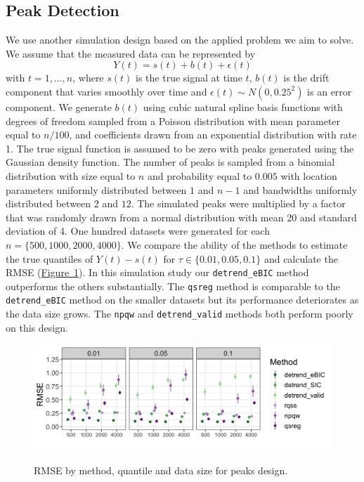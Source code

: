 \documentclass[12pt]{article}
\newcommand{\Fig}[1]{\hyperref[fig:#1]{Figure~\ref*{fig:#1}}} %
\newcommand{\Fig}[1]{{Figure~\ref{fig:#1}}} %
\begin{document}
	\subsection{Peak Detection}
	We use another simulation design based on the applied problem we aim to solve. We assume that the measured data can be represented by 
	\begin{equation}
	Y(t) = s(t) + b(t) + \epsilon(t)
	\end{equation} 
	with $t = 1, \ldots, n$, where $s(t)$ is the true signal at time $t$, $b(t)$ is the drift component that varies smoothly over time and $\epsilon(t) \sim N(0, 0.25^2)$ is an error component. We generate $b(t)$ using cubic natural spline basis functions with degrees of freedom sampled from a Poisson distribution with mean parameter equal to $n/100$,  and coefficients drawn from an exponential distribution with rate 1. The true signal function is assumed to be zero with peaks generated using the Gaussian density function. The number of peaks is sampled from a binomial distribution with size equal to $n$ and probability equal to $0.005$ with location parameters uniformly distributed between $1$ and $n-1$ and bandwidths uniformly distributed between $2$ and $12$. The simulated peaks were multiplied by a factor that was randomly drawn from a normal distribution with mean 20 and standard deviation of 4. One hundred datasets were generated for each $n=\{500, 1000, 2000, 4000\}$. We compare the ability of the methods to estimate the true quantiles of $Y(t)-s(t)$  for $\tau \in \{0.01, 0.05, 0.1\}$ and calculate the RMSE (\Fig{peaks_rmse}). In this simulation study our \texttt{detrend\_eBIC} method outperforms the others substantially. The \texttt{qsreg} method is comparable to the \texttt{detrend\_eBIC} method on the smaller datasets but its performance deteriorates as the data size grows. The \texttt{npqw} and \texttt{detrend\_valid} methods both perform poorly on this design. 
	
	\begin{figure}
		\caption{RMSE by method, quantile and data size for peaks design.}
		\includegraphics[width = \linewidth]{Figures/peaks_mse.png}	
		\label{fig:peaks_rmse}
	\end{figure}
	
\end{document}
